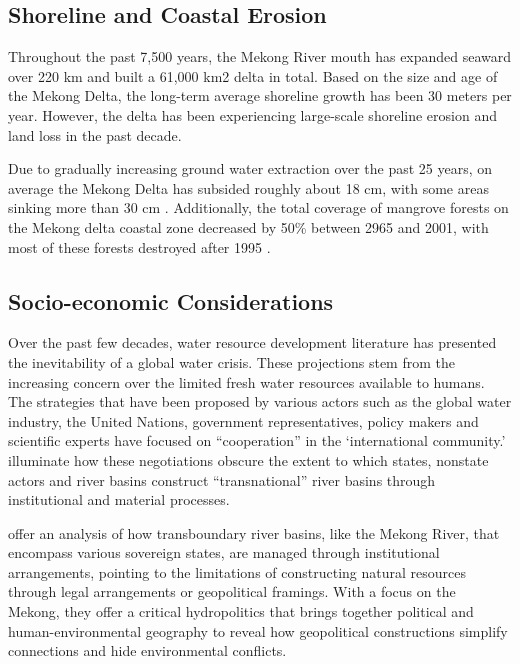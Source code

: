  

\subsection{Shoreline and Coastal Erosion}

Throughout the past 7,500 years, the Mekong River mouth has expanded seaward over 220 km and built a 61,000 km2 delta in total. Based on the size and age of the Mekong Delta, the long-term average shoreline growth has been 30 meters per year. However, the delta has been experiencing large-scale shoreline erosion and land loss in the past decade. 
  
Due to gradually increasing ground water extraction over the past 25 years, on average the Mekong Delta has subsided roughly about 18 cm, with some areas sinking more than 30 cm \citep{erban2014groundwater, minderhoud2017impacts}. Additionally, the total coverage of mangrove forests on the Mekong delta coastal zone decreased by 50\% between 2965 and 2001, with most of these forests destroyed after 1995 \citep{thu2007status}.

\subsection{Socio-economic Considerations}

Over the past few decades, water resource development literature has presented the inevitability of a global water crisis. These projections stem from the increasing concern over the limited fresh water resources available to humans.  The strategies that have been proposed by various actors such as the global water industry, the United Nations, government representatives, policy makers and scientific experts have focused on ``cooperation'' in the `international community.' \citet{sneddon2006rethinking} illuminate how these negotiations obscure the extent to which states, nonstate actors and river basins construct ``transnational'' river basins through institutional and material processes.
  
\citet{sneddon2006rethinking} offer an analysis of how transboundary river basins, like the Mekong River, that encompass various sovereign states, are managed through institutional arrangements, pointing to the limitations of constructing natural resources through legal arrangements or geopolitical framings. With a focus on the Mekong, they offer a critical hydropolitics that brings together political and human-environmental geography to reveal how geopolitical constructions simplify connections and hide environmental conflicts. 

